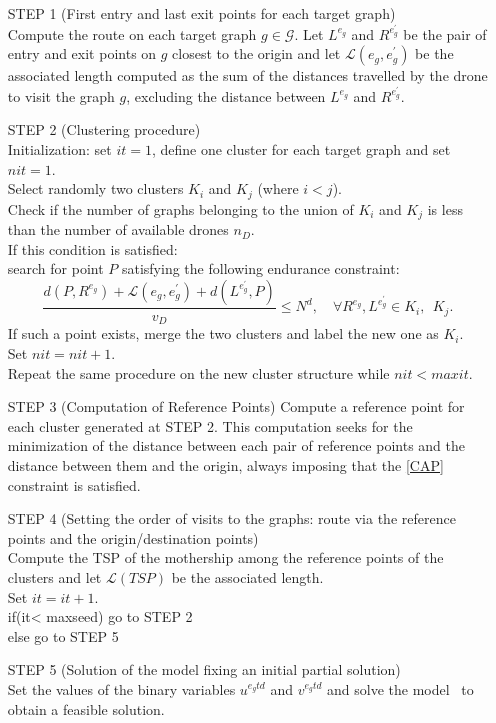 \begin{itemize} 
\item[STEP 1] (First entry and last exit points for each target graph)\\
Compute the route on each target graph $g \in \mathcal{G}$.
Let $L^{e_{g}}$ and $R^{e^{'}_{g}}$ be the pair of entry and exit points on $g$ closest to the origin and let  $\mathcal L(e_{g}, e^{'}_{g})$ be the associated length computed as the sum of the distances travelled by the drone to visit the graph $g$, excluding the distance between $L^{e_{g}}$ and $R^{e^{'}_{g}}$.
\item[STEP 2] (Clustering procedure)\\
Initialization: set $it=1$, define one cluster for each target graph and set $nit=1$. \\
Select randomly two clusters $K_i$ and $K_j$ (where $i<j$).\\
Check if the number of graphs belonging to the union of $K_i$ and $K_j$ is less than the number of available drones $n_D$.\\
If this condition is satisfied:\\
search for point $P$ satisfying the following endurance constraint:
$$
\frac{d(P, R^{e_g}) + \mathcal L(e_{g}, e^{'}_{g}) + d(L^{e^{'}_{g}}, P)}{v_D} \leq N^d, \quad \forall R^{e_g}, L^{e^{'}_{g}} \in K_i, \:\: K_j.
$$
If such a point exists, merge the two clusters and label the new one as $K_i$.\\
Set $nit=nit+1$.\\
Repeat the same procedure on the new cluster structure while $nit < maxit$.
\item[STEP 3] (Computation of Reference Points) 
Compute a reference point for each cluster generated at STEP 2. This computation seeks for the minimization of the distance between each pair of reference points and the distance between them and the origin, always imposing that the \eqref{CAP} constraint is satisfied.



\item [STEP 4] (Setting the order of visits to the  graphs: route via the reference points and the origin/destination points) \\
Compute the TSP of the mothership among the reference points of the clusters and let $\mathcal L(TSP)$ be the associated length.\\
Set $it=it+1$.\\
if(it< maxseed) go to STEP 2\\
else go to STEP 5
\item [STEP 5] (Solution of the \AMD\space model fixing an initial partial solution)\\
Set the values of the binary variables $u^{e_{g}td}$ and $v^{e_{g}td}$ and solve the model \AMD\, to obtain a feasible solution.
\end{itemize}
